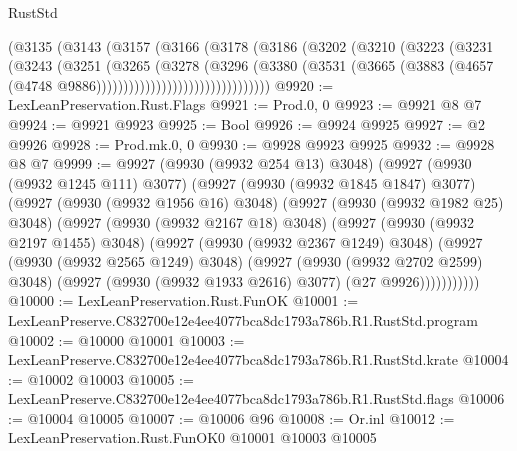 \begin{lexlean}{RustStd}
\begin{coremodule}
                          (@3135
                            (@3143
                              (@3157
                                (@3166
                                  (@3178
                                    (@3186
                                      (@3202
                                        (@3210
                                          (@3223
                                            (@3231
                                              (@3243
                                                (@3251
                                                  (@3265
                                                    (@3278
                                                      (@3296
                                                        (@3380
                                                          (@3531
                                                            (@3665
                                                              (@3883
                                                                (@4657
                                                                  (@4748
                                                                    @9886))))))))))))))))))))))))))))))))
@9920 := LexLeanPreservation.Rust.Flags
@9921 := Prod.{0, 0}
@9923 := @9921 @8 @7
@9924 := @9921 @9923
@9925 := Bool
@9926 := @9924 @9925
@9927 := @2 @9926
@9928 := Prod.mk.{0, 0}
@9930 := @9928 @9923 @9925
@9932 := @9928 @8 @7
@9999 := @9927
    (@9930 (@9932 @254 @13) @3048)
    (@9927
      (@9930 (@9932 @1245 @111) @3077)
      (@9927
        (@9930 (@9932 @1845 @1847) @3077)
        (@9927
          (@9930 (@9932 @1956 @16) @3048)
          (@9927
            (@9930 (@9932 @1982 @25) @3048)
            (@9927
              (@9930 (@9932 @2167 @18) @3048)
              (@9927
                (@9930 (@9932 @2197 @1455) @3048)
                (@9927
                  (@9930 (@9932 @2367 @1249) @3048)
                  (@9927
                    (@9930 (@9932 @2565 @1249) @3048)
                    (@9927
                      (@9930 (@9932 @2702 @2599) @3048)
                      (@9927 (@9930 (@9932 @1933 @2616) @3077) (@27 @9926)))))))))))
@10000 := LexLeanPreservation.Rust.FunOK
@10001 := LexLeanPreserve.C832700e12e4ee4077bca8dc1793a786b.R1.RustStd.program
@10002 := @10000 @10001
@10003 := LexLeanPreserve.C832700e12e4ee4077bca8dc1793a786b.R1.RustStd.krate
@10004 := @10002 @10003
@10005 := LexLeanPreserve.C832700e12e4ee4077bca8dc1793a786b.R1.RustStd.flags
@10006 := @10004 @10005
@10007 := @10006 @96
@10008 := Or.inl
@10012 := LexLeanPreservation.Rust.FunOK0 @10001 @10003 @10005

\end{coremodule}
\end{lexlean}
